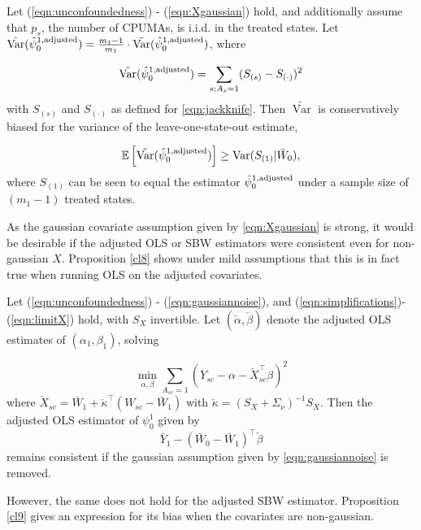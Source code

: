 \begin{proposition}\label{prop:jackknife}
Let (\ref{eqn:unconfoundedness}) - (\ref{eqn:Xgaussian}) hold, and additionally assume that $p_s$, the number of CPUMAs, is i.i.d. in the treated states. Let $\hat{\operatorname{Var}}(\hat{\psi}_0^{1, \textup{adjusted}}) = \frac{m_1-1}{m_1} \cdot \tilde{\operatorname{Var}}(\hat{\psi}_0^{1, \textup{adjusted}})$, where

\begin{equation} \label{eqn:prop.jackknife}
\tilde{\operatorname{Var}}(\hat{\psi}_0^{1, \textup{adjusted}}) = \sum_{s:A_{s}=1} (S_{(s)} - S_{(\cdot)})^2
\end{equation}
with $S_{(s)}$ and $S_{(\cdot)}$ as defined for \eqref{eqn:jackknife}. Then $\tilde{\operatorname{Var}}$ is conservatively biased for the variance of the leave-one-state-out estimate,

\[ \mathbb{E}\left[ \tilde{\operatorname{Var}}(\hat{\psi}_0^{1, \textup{adjusted}})\right] \geq \operatorname{Var}(S_{(1)} | \bar{W}_0),\]
where $S_{(1)}$ can be seen to equal the estimator $\hat{\psi}_0^{1,\textup{adjusted}}$ under a sample size of $(m_1-1)$ treated states.

\end{proposition}

As the gaussian covariate assumption given by \eqref{eqn:Xgaussian} is strong, it would be desirable if the adjusted OLS or SBW estimators were consistent even for non-gaussian $X$. Proposition \ref{cl8} shows under mild assumptions that this is in fact true when running OLS on the adjusted covariates. 

\begin{proposition}\label{cl8}
Let (\ref{eqn:unconfoundedness}) - (\ref{eqn:gaussiannoise}), and (\ref{eqn:simplifications})- (\ref{eqn:limitX}) hold, with $S_X$ invertible. Let $(\check{\alpha}, \check{\beta})$ denote the adjusted OLS estimates of $(\alpha_1, \beta_1)$, solving

\[ \min_{\alpha,\beta} \sum_{A_{sc}=1} (Y_{sc} - \alpha - \check{X}_{sc}^\top \beta)^2 \]
where $\check{X}_{sc} = \bar{W}_1 + \check{\kappa}^\top(W_{sc} - \bar{W}_1)$ with $\check{\kappa} = (S_X + \Sigma_\nu)^{-1}S_X$. Then the adjusted OLS estimator of $\psi_0^1$ given by
\[ \bar{Y}_1 - (\bar{W}_0 - \bar{W}_1)^\top \check{\beta}\]
remains consistent if the gaussian assumption given by \eqref{eqn:gaussiannoise} is removed.
\end{proposition}

However, the same does not hold for the adjusted SBW estimator. Proposition \ref{cl9} gives an expression for its bias when the covariates are non-gaussian. 

